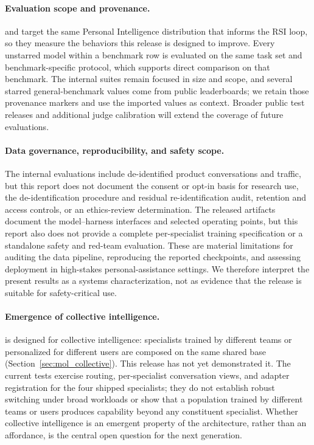 \paragraph{Evaluation scope and provenance.}
\chatbench{} and \livingbench{} target the same Personal Intelligence
distribution that informs the RSI loop, so they measure the behaviors this
release is designed to improve. Every unstarred model within a benchmark row is
evaluated on the same task set and benchmark-specific protocol, which supports
direct comparison on that benchmark. The internal suites remain focused in
size and scope, and several starred general-benchmark values come from public
leaderboards; we retain those provenance markers and use the imported values as
context. Broader public test releases and additional judge calibration will
extend the coverage of future evaluations.

\paragraph{Data governance, reproducibility, and safety scope.}
The internal evaluations include de-identified product conversations and traffic,
but this report does not document the consent or opt-in basis for research use,
the de-identification procedure and residual re-identification audit, retention
and access controls, or an ethics-review determination. The released artifacts
document the model--harness interfaces and selected operating points, but this
report also does not provide a complete per-specialist training specification or
a standalone safety and red-team evaluation. These are material limitations for
auditing the data pipeline, reproducing the reported checkpoints, and assessing
deployment in high-stakes personal-assistance settings. We therefore interpret
the present results as a systems characterization, not as evidence that the
release is suitable for safety-critical use.

\paragraph{Emergence of collective intelligence.}
\molshort{} is designed for collective intelligence: specialists trained by different teams or personalized for different users are composed on the same shared base (Section~\ref{sec:mol_collective}). This release has not yet demonstrated it. The current tests exercise routing, per-specialist conversation views, and adapter registration for the four shipped specialists; they do not establish robust switching under broad workloads or show that a population trained by different teams or users produces capability beyond any constituent specialist. Whether collective intelligence is an emergent property of the architecture, rather than an affordance, is the central open question for the next generation.

